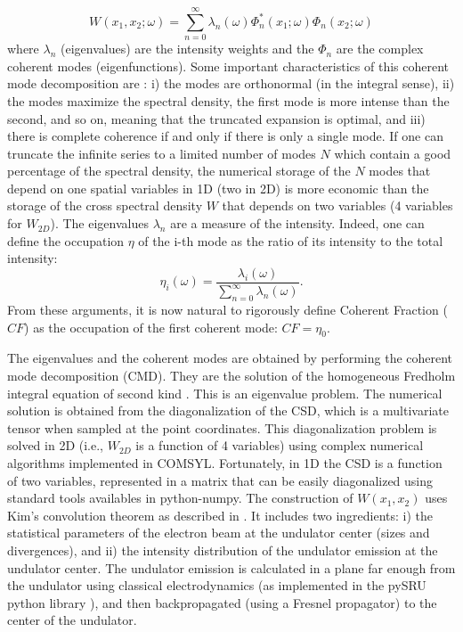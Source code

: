 \documentclass{iucr}              %
\begin{document}
\begin{equation}
W(x_1,x_2;\omega) = \sum_{n=0}^{\infty} \lambda_n(\omega) \Phi_n^*(x_1;\omega) \Phi_n(x_2;\omega) 
\label{eq:CMD}
\end{equation}
where $\lambda_n$ (eigenvalues) are the intensity weights and the $\Phi_n$ are the complex coherent modes (eigenfunctions). 
Some important characteristics of this coherent mode decomposition are \cite{mandel_wolf}: i) the modes are orthonormal (in the integral sense), ii) the modes maximize the spectral density, the first mode is more intense than the second, and so on, meaning that the truncated expansion is optimal, and iii) there is complete coherence if and only if there is only a single mode. If one can truncate the infinite series to a limited number of modes $N$ which contain a good percentage of the spectral density, the numerical storage of the $N$ modes that depend on one spatial variables in 1D (two in 2D) is more economic than the storage of the cross spectral density $W$ that depends on two variables (4 variables for $W_{2D}$). 
The eigenvalues $\lambda_n$ are a measure of the intensity. Indeed, one can define the occupation $\eta$ of the i-th mode as the ratio of its intensity to the total intensity: 
\begin{equation}
\label{eq:occupation}
\eta_i(\omega) = \frac{\lambda_i(\omega)}{\sum_{n=0}^{\infty} \lambda_n(\omega)}.
\end{equation}
From these arguments, it is now natural to rigorously define Coherent Fraction ($CF$) as the occupation of the first coherent mode: $CF=\eta_0$.

The eigenvalues and the coherent modes are obtained by performing the coherent mode decomposition (CMD). They are the solution of the homogeneous Fredholm integral equation of second kind \cite{glass2017}. This is an eigenvalue problem. The numerical solution is obtained from the diagonalization of the CSD, which is a multivariate tensor when sampled at the point coordinates. This diagonalization problem is solved in 2D (i.e., $W_{2D}$ is a function of 4 variables) using complex numerical algorithms implemented in COMSYL. Fortunately, in 1D the CSD is a function of two variables, represented in a matrix that can be easily diagonalized using standard tools availables in python-numpy. The construction of $W(x_1,x_2)$ uses Kim's convolution theorem \cite{kim1986b} as described in . It includes two ingredients: i) the statistical parameters of the electron beam at the undulator center (sizes and divergences), and ii) the intensity distribution of the undulator emission at the undulator center. The undulator emission is calculated in a plane far enough from the undulator using classical electrodynamics \cite{jackson} (as implemented in the pySRU python library \cite{pySRU}), and then backpropagated (using a Fresnel propagator) to the center of the undulator. 
\end{document}
